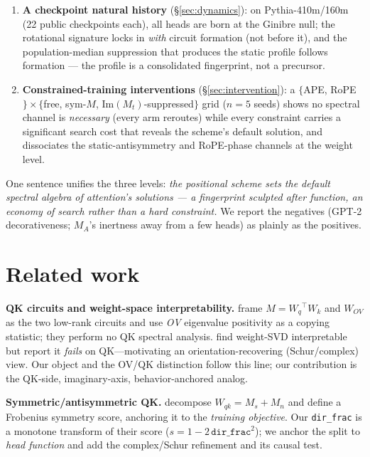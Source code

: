 \documentclass[11pt]{article}
\newcommand{\dirfrac}{\texttt{dir\_frac}\xspace}
\newcommand{\M}{\ensuremath{M}\xspace}
\newcommand{\MA}{\ensuremath{M_A}\xspace}
\newcommand{\Mt}{\ensuremath{M_t}\xspace}
\newcommand{\Wq}{\ensuremath{W_q}}
\newcommand{\Wk}{\ensuremath{W_k}}
\newcommand{\Rope}{RoPE\xspace}
\begin{document}
\begin{enumerate}
kernel and destroys induction on exactly the flagged heads.
\item \textbf{A checkpoint natural history} (\S\ref{sec:dynamics}): on Pythia-410m/160m (22 public checkpoints each),
all heads are born at the Ginibre null; the rotational signature locks in \emph{with} circuit formation (not before
it), and the population-median suppression that produces the static profile follows formation --- the profile is a
consolidated fingerprint, not a precursor.
\item \textbf{Constrained-training interventions} (\S\ref{sec:intervention}): a $\{$APE, \Rope$\}\times\{$free,
sym-\M, $\mathrm{Im}(\Mt)$-suppressed$\}$ grid ($n{=}5$ seeds) shows no spectral channel is \emph{necessary}
(every arm reroutes) while every constraint carries a significant search cost that reveals the scheme's default
solution, and dissociates the static-antisymmetry and \Rope-phase channels at the weight level.
\end{enumerate}
One sentence unifies the three levels: \emph{the positional scheme sets the default spectral algebra of attention's
solutions --- a fingerprint sculpted after function, an economy of search rather than a hard constraint.}
We report the negatives (GPT-2 decorativeness; \MA's inertness away from a few heads) as plainly as the positives.

\section{Related work}
\textbf{QK circuits and weight-space interpretability.} \citet{elhage2021framework} frame $\M{=}\Wq^\top\Wk$ and
$W_{OV}$ as the two low-rank circuits and use \emph{OV} eigenvalue positivity as a copying statistic; they perform no
QK spectral analysis. \citet{millidge2022svd} find weight-SVD interpretable but report it \emph{fails} on QK---motivating
an orientation-recovering (Schur/complex) view. Our object and the OV/QK distinction follow this line; our contribution
is the QK-side, imaginary-axis, behavior-anchored analog.

\textbf{Symmetric/antisymmetric QK.} \citet{saponati2025} decompose $W_{qk}{=}M_s{+}M_n$ and define a Frobenius
symmetry score, anchoring it to the \emph{training objective}. Our \dirfrac is a monotone transform of their score
($s = 1-2\,\dirfrac^2$); we anchor the split to \emph{head function} and add the complex/Schur refinement and its
causal test.
\end{document}
